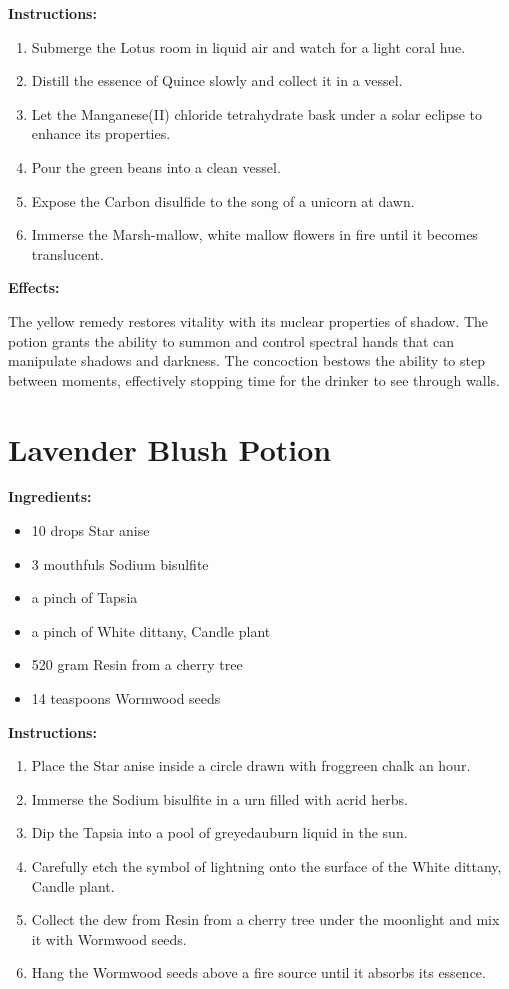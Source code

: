 \documentclass{article}
\begin{document}
\textbf{Instructions:}

\begin{enumerate}
  \item Submerge the Lotus room in liquid air and watch for a light coral hue.
  \item Distill the essence of Quince slowly and collect it in a vessel.
  \item Let the Manganese(II) chloride tetrahydrate bask under a solar eclipse to enhance its properties.
  \item Pour the green beans into a clean vessel.
  \item Expose the Carbon disulfide to the song of a unicorn at dawn.
  \item Immerse the Marsh-mallow, white mallow flowers in fire until it becomes translucent.
\end{enumerate}

\textbf{Effects:}

The yellow remedy restores vitality with its nuclear properties of shadow. The potion grants the ability to summon and control spectral hands that can manipulate shadows and darkness. The concoction bestows the ability to step between moments, effectively stopping time for the drinker to see through walls.

\newpage
\section*{Lavender Blush Potion}

\textbf{Ingredients:}

\begin{itemize}
  \item 10 drops Star anise
  \item 3 mouthfuls Sodium bisulfite
  \item a pinch of Tapsia
  \item a pinch of White dittany, Candle plant
  \item 520 gram Resin from a cherry tree
  \item 14 teaspoons Wormwood seeds
\end{itemize}

\textbf{Instructions:}

\begin{enumerate}
  \item Place the Star anise inside a circle drawn with froggreen chalk an hour.
  \item Immerse the Sodium bisulfite in a urn filled with acrid herbs.
  \item Dip the Tapsia into a pool of greyedauburn liquid in the sun.
  \item Carefully etch the symbol of lightning onto the surface of the White dittany, Candle plant.
  \item Collect the dew from Resin from a cherry tree under the moonlight and mix it with Wormwood seeds.
  \item Hang the Wormwood seeds above a fire source until it absorbs its essence.
\end{enumerate}
\end{document}
